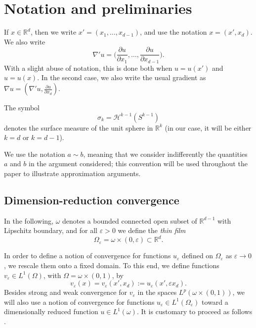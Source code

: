 \documentclass[11pt]{article}
\def\e{\varepsilon}
\begin{document}
\section{Notation and preliminaries}\label{notation}



If $x\in\mathbb R^d$, then we write $x'=(x_1,\ldots, x_{d-1})$, and use the notation $x=(x',x_d)$.
We also write 
$$
\nabla'u=\Big(\frac{\partial u}{\partial x_1},\ldots, \frac{\partial u}{\partial x_{d-1}}\Big).
$$
With a slight abuse of notation, this is done both when $u=u(x')$ and $u=u(x)$. In the second case, we also write the usual gradient as $\nabla u=(\nabla'u, \tfrac{\partial u}{\partial x_d})$.

The symbol
\begin{equation}\label{defsigma}
    \sigma_{k}=\mathcal H^{k-1}(S^{k-1})
\end{equation} 
denotes the surface measure of the unit sphere in $\mathbb R^k$ (in our case, it will be either  $k=d$ or $k=d-1$).

We use the notation $a\sim b$, meaning that we consider indifferently the  quantities $a$ and $b$ in the argument considered; this convention will be used throughout the paper to illustrate approximation arguments.

\subsection{Dimension-reduction convergence}
In the following, $\omega$ denotes a bounded connected open subset of $\mathbb R^{d-1}$ with Lipschitz boundary, and for all $\e>0$
we define the {\em thin film}
$$
\Omega_\e=\omega\times (0,\e)\subset \mathbb R^d.
$$


In order to define a notion of convergence for functions $u_\varepsilon$ defined on $\Omega_\varepsilon$ as $\varepsilon \to 0$, we rescale them onto a fixed domain. To this end, we define functions $v_\varepsilon \in L^1(\Omega)$, with $\Omega = \omega \times (0,1)$, by
\begin{equation}\label{scaled-ve}
v_\varepsilon(x) = v_\varepsilon(x', x_d) := u_\varepsilon(x', \varepsilon x_d).
\end{equation}
Besides strong and weak convergence for $v_\varepsilon$ in the spaces $L^p(\omega \times (0,1))$, we will also use a notion of convergence for functions $u_\varepsilon \in L^1(\Omega_\varepsilon)$ toward a dimensionally reduced function $u \in L^1(\omega)$. It is customary to proceed as follows \cite{LDR,BFF}. 
\end{document}
